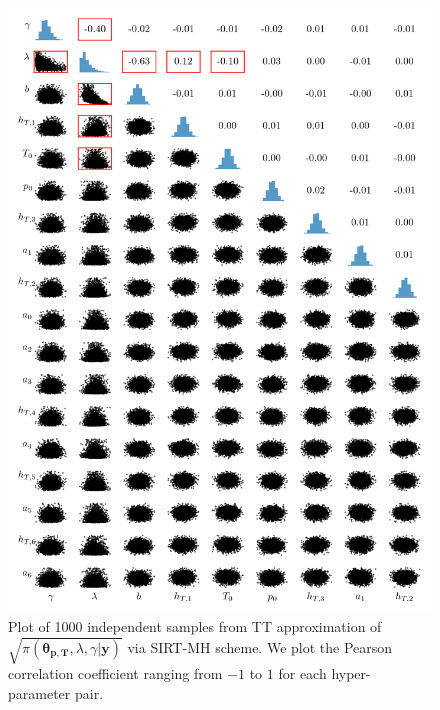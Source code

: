\begin{figure}[h]%
	\includegraphics[]{CorrPlot.png}
	\caption[Correlation plot of samples from TT approximation]{Plot of 1000 independent samples from TT approximation of $\sqrt{\pi( \bm{\theta}_{\bm{p}, \bm{T}},\lambda,\gamma  | \bm{y})}$ via SIRT-MH  scheme. We plot the Pearson correlation coefficient ranging from $-1$ to $1$ for each hyper-parameter pair.}
	\label{fig:CorrPlot}
\end{figure}
